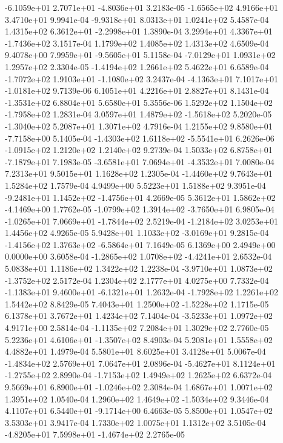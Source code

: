 -6.1059e+01  2.7071e+01 -4.8036e+01  3.2183e-05
-1.6565e+02  4.9166e+01  3.4710e+01  9.9941e-04
-9.9318e+01  8.0313e+01  1.0241e+02  5.4587e-04
 1.4315e+02  6.3612e+01 -2.2998e+01  1.3890e-04
 3.2994e+01  4.3367e+01 -1.7436e+02  3.1517e-04
1.1799e+02 1.4085e+02 1.4313e+02  4.6509e-04
 9.4078e+00  7.9959e+01 -9.5605e+01  5.1158e-04
-7.0129e+01  1.0931e+02  1.2957e+02  2.3304e-05
-1.4194e+02  1.2661e+02  5.4622e+01  6.6589e-04
-1.7072e+02  1.9103e+01 -1.1080e+02  3.2437e-04
-4.1363e+01  7.1017e+01 -1.0181e+02  9.7139e-06
6.1051e+01 4.2216e+01 2.8827e+01  8.1431e-04
-1.3531e+02  6.8804e+01  5.6580e+01  5.3556e-06
 1.5292e+02  1.1504e+02 -1.7958e+02  1.2831e-04
 3.0597e+01  1.4879e+02 -1.5618e+02  5.2020e-05
-1.3040e+02  5.2087e+01  1.3071e+02  4.7916e-04
 1.2155e+02  9.8580e+01 -7.7158e+00  5.1405e-04
-1.4303e+02  1.6118e+02 -5.5541e+01  6.2626e-06
-1.0915e+02  1.2120e+02  1.2140e+02  9.2739e-04
 1.5033e+02  6.8758e+01 -7.1879e+01  7.1983e-05
-3.6581e+01  7.0694e+01 -4.3532e+01  7.0080e-04
7.2313e+01 9.5015e+01 1.1628e+02  1.2305e-04
-1.4460e+02  9.7643e+01  1.5284e+02  1.7579e-04
4.9499e+00 5.5223e+01 1.5188e+02  9.3951e-04
-9.2481e+01  1.1452e+02 -1.4756e+01  4.2669e-05
 5.3612e+01  1.5862e+02 -4.1469e+00  1.7762e-05
-1.0799e+02  1.3914e+02 -3.7650e+01  6.9805e-04
-1.0265e+01  7.0669e+01 -1.7844e+02  2.5219e-04
-1.2184e+02  3.0253e+01  1.4456e+02  4.9265e-05
 5.9428e+01  1.1033e+02 -3.0169e+01  9.2815e-04
-1.4156e+02  1.3763e+02 -6.5864e+01  7.1649e-05
6.1369e+00 2.4949e+00 0.0000e+00  3.6058e-04
-1.2865e+02  1.0708e+02 -4.4241e+01  2.6532e-04
5.0838e+01 1.1186e+02 1.3422e+02  1.2238e-04
-3.9710e+01  1.0873e+02 -1.3752e+02  2.5172e-04
1.2304e+02 2.1777e+01 4.0275e+00  7.7332e-04
-1.1383e+01  9.4600e+01 -6.1321e+01  1.2632e-04
-1.7928e+02  1.2261e+02  1.5442e+02  8.8429e-05
 7.4043e+01  1.2500e+02 -1.5228e+02  1.1715e-05
6.1378e+01 3.7672e+01 1.4234e+02  7.1404e-04
-3.5233e+01  1.0972e+02  4.9171e+00  2.5814e-04
-1.1135e+02  7.2084e+01  1.3029e+02  2.7760e-05
 5.2236e+01  4.6106e+01 -1.3507e+02  8.4903e-04
5.2081e+01 1.5558e+02 4.4882e+01  1.4979e-04
5.5801e+01 8.6025e+01 3.4128e+01  5.0067e-04
-1.4834e+02  2.5769e+01  7.0647e+01  2.0896e-04
-5.4627e+01  8.1124e+01 -1.2755e+02  2.8990e-04
-1.7153e+02  1.4949e+02  1.2625e+02  6.6372e-04
 9.5669e+01  6.8900e+01 -1.0246e+02  2.3084e-04
1.6867e+01 1.0071e+02 1.3951e+02  1.0540e-04
 1.2960e+02  1.4649e+02 -1.5034e+02  9.3446e-04
 4.1107e+01  6.5440e+01 -9.1714e+00  6.4663e-05
5.8500e+01 1.0547e+02 3.5303e+01  3.9417e-04
1.7330e+02 1.0075e+01 1.1312e+02  3.5105e-04
-4.8205e+01  7.5998e+01 -1.4674e+02  2.2765e-05
